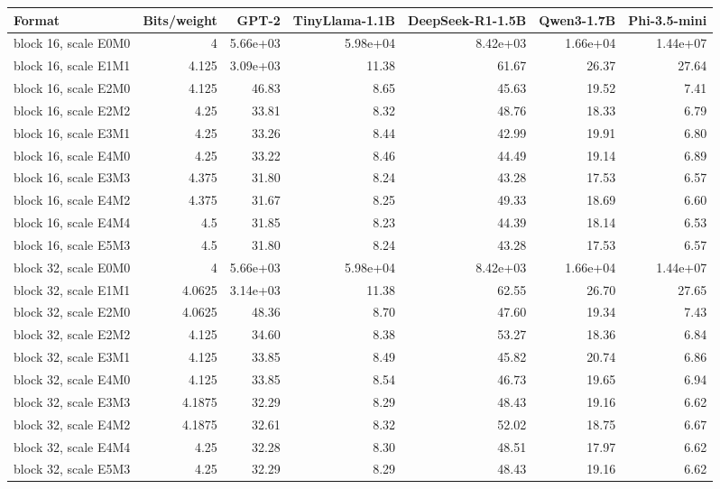 \begin{tabular}{lrrrrrr}
\toprule
Format & Bits/weight & GPT-2 & TinyLlama-1.1B & DeepSeek-R1-1.5B & Qwen3-1.7B & Phi-3.5-mini \\
\midrule
block 16, scale E0M0 & 4 & 5.66e+03 & 5.98e+04 & 8.42e+03 & 1.66e+04 & 1.44e+07 \\
block 16, scale E1M1 & 4.125 & 3.09e+03 & 11.38 & 61.67 & 26.37 & 27.64 \\
block 16, scale E2M0 & 4.125 & 46.83 & 8.65 & 45.63 & 19.52 & 7.41 \\
block 16, scale E2M2 & 4.25 & 33.81 & 8.32 & 48.76 & 18.33 & 6.79 \\
block 16, scale E3M1 & 4.25 & 33.26 & 8.44 & 42.99 & 19.91 & 6.80 \\
block 16, scale E4M0 & 4.25 & 33.22 & 8.46 & 44.49 & 19.14 & 6.89 \\
block 16, scale E3M3 & 4.375 & 31.80 & 8.24 & 43.28 & 17.53 & 6.57 \\
block 16, scale E4M2 & 4.375 & 31.67 & 8.25 & 49.33 & 18.69 & 6.60 \\
block 16, scale E4M4 & 4.5 & 31.85 & 8.23 & 44.39 & 18.14 & 6.53 \\
block 16, scale E5M3 & 4.5 & 31.80 & 8.24 & 43.28 & 17.53 & 6.57 \\
block 32, scale E0M0 & 4 & 5.66e+03 & 5.98e+04 & 8.42e+03 & 1.66e+04 & 1.44e+07 \\
block 32, scale E1M1 & 4.0625 & 3.14e+03 & 11.38 & 62.55 & 26.70 & 27.65 \\
block 32, scale E2M0 & 4.0625 & 48.36 & 8.70 & 47.60 & 19.34 & 7.43 \\
block 32, scale E2M2 & 4.125 & 34.60 & 8.38 & 53.27 & 18.36 & 6.84 \\
block 32, scale E3M1 & 4.125 & 33.85 & 8.49 & 45.82 & 20.74 & 6.86 \\
block 32, scale E4M0 & 4.125 & 33.85 & 8.54 & 46.73 & 19.65 & 6.94 \\
block 32, scale E3M3 & 4.1875 & 32.29 & 8.29 & 48.43 & 19.16 & 6.62 \\
block 32, scale E4M2 & 4.1875 & 32.61 & 8.32 & 52.02 & 18.75 & 6.67 \\
block 32, scale E4M4 & 4.25 & 32.28 & 8.30 & 48.51 & 17.97 & 6.62 \\
block 32, scale E5M3 & 4.25 & 32.29 & 8.29 & 48.43 & 19.16 & 6.62 \\
\bottomrule
\end{tabular}
